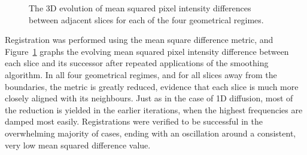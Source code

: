 \begin{figure}
    \caption{The 3D evolution of mean squared pixel intensity differences between adjacent slices for each of the four geometrical regimes.}
    \label{fig:mean_squared_differences_3D}
  \end{figure}
  
  Registration was performed using the mean square difference metric, and Figure~\ref{fig:mean_squared_differences_3D} graphs the evolving mean squared pixel intensity difference between each slice and its successor after repeated applications of the smoothing algorithm. In all four geometrical regimes, and for all slices away from the boundaries, the metric is greatly reduced, evidence that each slice is much more closely aligned with its neighbours. Just as in the case of 1D diffusion, most of the reduction is yielded in the earlier iterations, when the highest frequencies are damped most easily. Registrations were verified to be successful in the overwhelming majority of cases, ending with an oscillation around a consistent, very low mean squared difference value.
  
